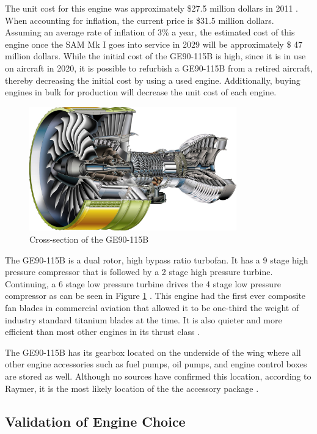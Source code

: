 The unit cost for this engine was approximately \$27.5 million dollars in 2011 \cite{gecost}. When accounting for inflation, the current price is \$31.5 million dollars. Assuming an average rate of inflation of 3\% a year, the estimated cost of this engine once the SAM Mk I goes into service in 2029 will be approximately \$ 47 million dollars. While the initial cost of the GE90-115B is high, since it is in use on aircraft in 2020, it is possible to refurbish a GE90-115B from a retired aircraft, thereby decreasing the initial cost by using a used engine. Additionally, buying engines in bulk for production will decrease the unit cost of each engine.

\begin{figure} [h!]
    \centering
    \includegraphics[width=0.8\textwidth]{Photos/ge90cross.jpg}
    \caption{Cross-section of the GE90-115B}
    \label{fig:GeCross}
\end{figure}

The GE90-115B is a dual rotor, high bypass ratio turbofan. It has a 9 stage high pressure compressor that is followed by a 2 stage high pressure turbine. Continuing, a 6 stage low pressure turbine drives the 4 stage low pressure compressor as can be seen in Figure \ref{fig:GeCross} \cite{gecross}. This engine had the first ever composite fan blades in commercial aviation that allowed it to be one-third the weight of industry standard titanium blades at the time. It is also quieter and more efficient than most other engines in its thrust class \cite{ge90}.

The GE90-115B has its gearbox located on the underside of the wing where all other engine accessories such as fuel pumps, oil pumps, and engine control boxes are stored as well. Although no sources have confirmed this location, according to Raymer, it is the most likely location of the the accessory package \cite{raymer}.

\subsection{Validation of Engine Choice}

